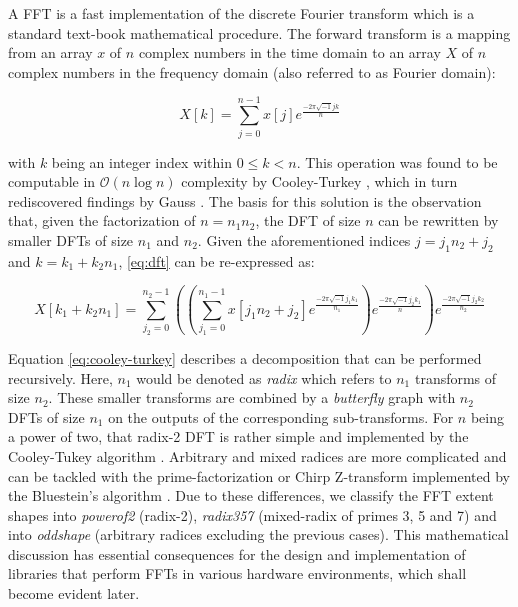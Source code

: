 A FFT is a fast implementation of the discrete Fourier transform which is a standard text-book mathematical procedure. The forward transform is a mapping from an array $x$ of $n$ complex numbers in the time domain to an array $X$ of $n$ complex numbers in the frequency domain (also referred to as Fourier domain):

\begin{equation}
  \label{eq:dft}
  X[k] = \sum_{j=0}^{n-1} x[j]e^{\frac{-2\pi\sqrt{-1}jk}{n}}
\end{equation}

with $k$ being an integer index within $0 \le k < n$. This operation was found to be computable in $\mathcal{O}(n \log n)$ complexity by Cooley-Turkey \cite{cooley1965algorithm}, which in turn rediscovered findings by Gauss \cite{gauss}. The basis for this solution is the observation that, given the factorization of $n=n_1n_2$, the  DFT of size $n$ can be rewritten by smaller DFTs of size $n_1$ and $n_2$.  Given the aforementioned indices $j=j_1n_2 + j_2$ and $k=k_1+k_2n_1$, \cref{eq:dft} can be re-expressed as:

\begin{equation}
  \label{eq:cooley-turkey}
  X[k_1 + k_2n_1] = \sum_{j_2=0}^{n_2-1} \left( \left( \sum_{j_1=0}^{n_1-1} x[j_1n_2 + j_2] e^{\frac{-2\pi\sqrt{-1}j_1k_1}{n_1}} \right) e^{\frac{-2\pi\sqrt{-1}j_2k_1}{n}} \right) e^{\frac{-2\pi\sqrt{-1}j_2k_2}{n_2}}
\end{equation}

Equation \cref{eq:cooley-turkey} describes a decomposition that can be performed recursively. Here, $n_1$ would be denoted as \emph{radix} which refers to $n_1$ transforms of size $n_2$. These smaller transforms are combined by a \emph{butterfly} graph with $n_2$ DFTs of size $n_1$ on the outputs of the corresponding sub-transforms.
For $n$ being a power of two, that radix-2 DFT is rather simple and implemented by the Cooley-Tukey algorithm \cite{cooley1965algorithm}.
Arbitrary and mixed radices are more complicated and can be tackled with the prime-factorization or Chirp Z-transform implemented by the Bluestein's algorithm \cite{bluestein}.
Due to these differences, we classify the FFT extent shapes into \emph{powerof2} (radix-2), \emph{radix357} (mixed-radix of primes 3, 5 and 7) and into \emph{oddshape} (arbitrary radices excluding the previous cases).
This mathematical discussion has essential consequences for the design and implementation of libraries that perform FFTs in various hardware environments, which shall become evident later.

